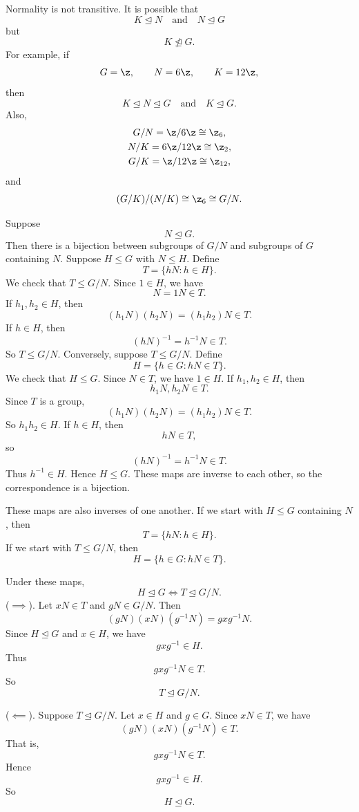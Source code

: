 Normality is not transitive.
It is possible that
\[
    K\trianglelefteq N
    \quad\text{and}\quad
    N\trianglelefteq G
\]
but
\[
    K\ntrianglelefteq G.
\]
For example, if
\[
    G=\z,\qquad N=6\z,\qquad K=12\z,
\]
then
\[
    K\trianglelefteq N\trianglelefteq G
    \quad\text{and}\quad
    K\trianglelefteq G.
\]
Also,
\begin{gather*}
    G/N=\z/6\z\cong \z_6,\\
    N/K=6\z/12\z\cong \z_2,\\
    G/K=\z/12\z\cong \z_{12},\\
\end{gather*}
and
\[
    (G/K)/(N/K)\cong \z_6\cong G/N.
\]

\begin{theorem}{
    Suppose
    \[
        N\trianglelefteq G.
    \]
    Then there is a bijection between subgroups of $G/N$ and subgroups of $G$ containing $N$.
}
Suppose $H\leq G$ with $N\leq H$.
Define
\[
    T=\{hN:h\in H\}.
\]
We check that $T\leq G/N$.
Since $1\in H$, we have
\[
    N=1N\in T.
\]
If $h_1,h_2\in H$, then
\[
    (h_{1}N)(h_{2}N)=(h_{1}h_2)N\in T.
\]
If $h\in H$, then
\[
    (hN)^{-1}=h^{-1}N\in T.
\]
So $T\leq G/N$.
Conversely, suppose $T\leq G/N$.
Define
\[
    H=\{h\in G:hN\in T\}.
\]
We check that $H\leq G$.
Since $N\in T$, we have $1\in H$.
If $h_1,h_2\in H$, then
\[
    h_{1}N,h_{2}N\in T.
\]
Since $T$ is a group,
\[
    (h_{1}N)(h_{2}N)=(h_{1}h_2)N\in T.
\]
So $h_{1}h_2\in H$.
If $h\in H$, then
\[
    hN\in T,
\]
so
\[
    (hN)^{-1}=h^{-1}N\in T.
\]
Thus $h^{-1}\in H$.
Hence $H\leq G$.
These maps are inverse to each other, so the correspondence is a bijection.
\end{theorem}

These maps are also inverses of one another.
If we start with $H\leq G$ containing $N$, then
\[
    T=\{hN:h\in H\}.
\]
If we start with $T\leq G/N$, then
\[
    H=\{h\in G:hN\in T\}.
\]

\begin{proposition}{
    Under these maps,
    \[
        H\trianglelefteq G
        \iff
        T\trianglelefteq G/N.
    \]
}
($\implies$).
    Let $xN\in T$ and $gN\in G/N$.
Then
    \[
        (gN)(xN)(g^{-1}N)=gxg^{-1}N.
    \]
    Since $H\trianglelefteq G$ and $x\in H$, we have
    \[
        gxg^{-1}\in H.
    \]
    Thus
    \[
        gxg^{-1}N\in T.
    \]
    So
    \[
        T\trianglelefteq G/N.
    \]

    ($\impliedby$).
    Suppose $T\trianglelefteq G/N$.
    Let $x\in H$ and $g\in G$.
    Since $xN\in T$, we have
    \[
        (gN)(xN)(g^{-1}N)\in T.
    \]
    That is,
    \[
        gxg^{-1}N\in T.
    \]
    Hence
    \[
        gxg^{-1}\in H.
    \]
    So
    \[
        H\trianglelefteq G.
    \]
\end{proposition}

